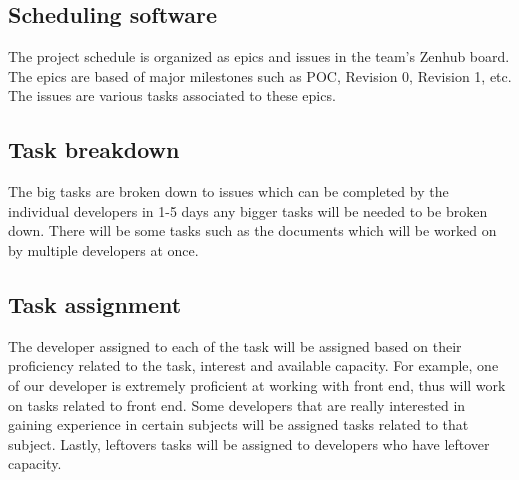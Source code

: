 \documentclass{article}
\begin{document}
\subsection{Scheduling software}
The project schedule is organized as epics and issues in the team's Zenhub board. The epics are based of major milestones such as POC, Revision 0, Revision 1, etc. The issues are various tasks associated to these epics.
\subsection{Task breakdown}
The big tasks are broken down to issues which can be completed by the individual developers in 1-5 days any bigger tasks will be needed to be broken down. There will be some tasks such as the documents which will be worked on by multiple developers at once.
\subsection{Task assignment}
The developer assigned to each of the task will be assigned based on their proficiency related to the task, interest and available capacity. For example, one of our developer is extremely proficient at working with front end, thus will work on tasks related to front end. Some developers that are really interested in gaining experience in certain subjects will be assigned tasks related to that subject. Lastly, leftovers tasks will be assigned to developers who have leftover capacity.
\end{document}
